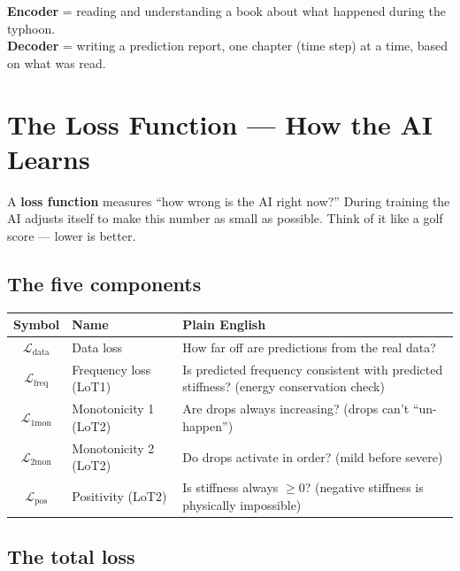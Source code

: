 \documentclass[11pt,a4paper]{article}
\begin{document}
\begin{tcolorbox}[colback=yellow!5, colframe=yellow!50!black, title=Analogy]
\textbf{Encoder} = reading and understanding a book about what happened
during the typhoon. \\
\textbf{Decoder} = writing a prediction report, one chapter (time step) at
a time, based on what was read.
\end{tcolorbox}

\section{The Loss Function --- How the AI Learns}
\label{sec:loss}

A \textbf{loss function} measures ``how wrong is the AI right now?''  During
training the AI adjusts itself to make this number as small as possible.
Think of it like a golf score --- lower is better.

\subsection{The five components}

\begin{center}
\begin{tabular}{clp{7cm}}
\toprule
\textbf{Symbol} & \textbf{Name} & \textbf{Plain English} \\
\midrule
$\mathcal{L}_{\text{data}}$ & Data loss &
  How far off are predictions from the real data? \\[4pt]
$\mathcal{L}_{\text{freq}}$ & Frequency loss (LoT1) &
  Is predicted frequency consistent with predicted stiffness?
  (energy conservation check) \\[4pt]
$\mathcal{L}_{\text{1mon}}$ & Monotonicity 1 (LoT2) &
  Are drops always increasing?  (drops can't ``un-happen'') \\[4pt]
$\mathcal{L}_{\text{2mon}}$ & Monotonicity 2 (LoT2) &
  Do drops activate in order?  (mild before severe) \\[4pt]
$\mathcal{L}_{\text{pos}}$ & Positivity (LoT2) &
  Is stiffness always $\geq 0$?  (negative stiffness is
  physically impossible) \\
\bottomrule
\end{tabular}
\end{center}

\subsection{The total loss}
\end{document}
